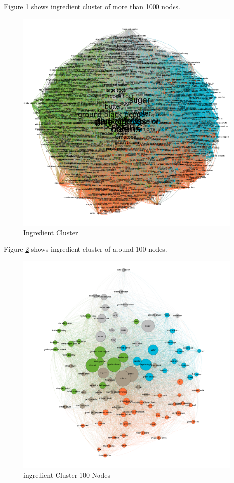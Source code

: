 \documentclass[sigconf]{acmart}
\begin{document}
Figure \ref{f:ingredient_modularity} shows ingredient cluster of more than 1000 nodes. 
\begin{figure}[!ht]
  \centering\includegraphics[width=\columnwidth]{images/ingredient_modularity.png}
  \caption{Ingredient Cluster }\label{f:ingredient_modularity}
\end{figure}

Figure \ref{f:ingredient_modularity100} shows ingredient cluster of around 100 nodes. 
\begin{figure}[!ht]
  \centering\includegraphics[width=\columnwidth]{images/ingredient_modularity100.png}
  \caption{ingredient Cluster 100 Nodes }\label{f:ingredient_modularity100}
\end{figure}
\end{document}

